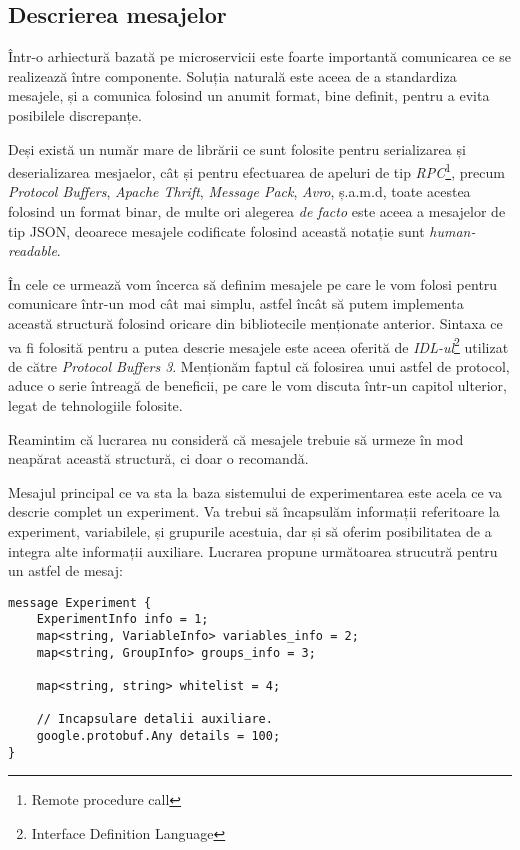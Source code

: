 \subsection{Descrierea mesajelor}

Într-o arhiectură bazată pe microservicii este foarte importantă comunicarea ce se realizează între componente. Soluția naturală este aceea de a standardiza mesajele, și a comunica folosind un anumit format, bine definit, pentru a evita posibilele discrepanțe.

Deși există un număr mare de librării ce sunt folosite pentru serializarea și deserializarea mesjaelor, cât și pentru efectuarea de apeluri de tip \textit{RPC}\footnote{Remote procedure call}, precum \textit{Protocol Buffers}, \textit{Apache Thrift}, \textit{Message Pack}, \textit{Avro}, ș.a.m.d, toate acestea folosind un format binar, de multe ori alegerea \textit{de facto} este aceea a mesajelor de tip JSON, deoarece mesajele codificate folosind această notație sunt \textit{human-readable}.

În cele ce urmează vom încerca să definim mesajele pe care le vom folosi pentru comunicare într-un mod cât mai simplu, astfel încât să putem implementa această structură folosind oricare din bibliotecile menționate anterior. Sintaxa ce va fi folosită pentru a putea descrie mesajele este aceea oferită de \textit{IDL-ul}\footnote{Interface Definition Language} utilizat de către \textit{Protocol Buffers 3}. Menționăm faptul că folosirea unui astfel de protocol, aduce o serie întreagă de beneficii, pe care le vom discuta într-un capitol ulterior, legat de tehnologiile folosite.

\begin{remark}
	Reamintim că lucrarea nu consideră că mesajele trebuie să urmeze în mod neapărat această structură, ci doar o recomandă.
\end{remark}

Mesajul principal ce va sta la baza sistemului de experimentarea este acela ce va descrie complet un experiment. Va trebui să încapsulăm informații referitoare la experiment, variabilele, și grupurile acestuia, dar și să oferim posibilitatea de a integra alte informații auxiliare. Lucrarea propune următoarea strucutră pentru un astfel de mesaj:

\break

\begin{center}
	\begin{lstlisting}[language=proto3]
message Experiment {
	ExperimentInfo info = 1;
	map<string, VariableInfo> variables_info = 2;
	map<string, GroupInfo> groups_info = 3;
	
	map<string, string> whitelist = 4;
	
	// Incapsulare detalii auxiliare.
	google.protobuf.Any details = 100;
}
	\end{lstlisting}
\end{center}

